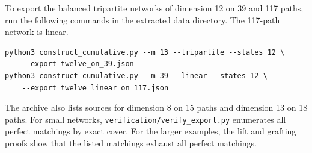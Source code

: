 \documentclass[10pt]{article}
\numberwithin{equation}{section}
\begin{document}
\begin{samepage}
To export the balanced tripartite networks of dimension 12 on 39 and 117 paths, run the following commands in the extracted data directory. The 117-path network is linear.
\begin{verbatim}
python3 construct_cumulative.py --m 13 --tripartite --states 12 \
    --export twelve_on_39.json
python3 construct_cumulative.py --m 39 --linear --states 12 \
    --export twelve_linear_on_117.json
\end{verbatim}
\end{samepage}
The archive also lists sources for dimension 8 on 15 paths and dimension 13 on 18 paths. For small networks, \texttt{verification/verify\_export.py} enumerates all perfect matchings by exact cover. For the larger examples, the lift and grafting proofs show that the listed matchings exhaust all perfect matchings.



\end{document}
